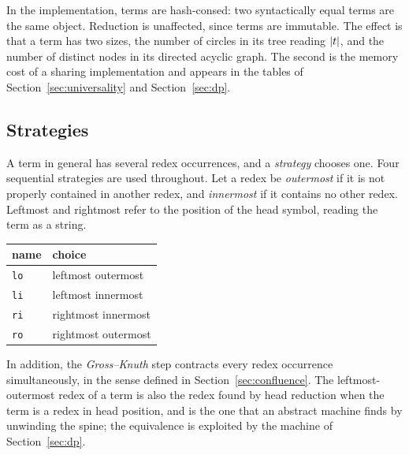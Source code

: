 \begin{remark}[Interning]
In the implementation, terms are hash-consed: two syntactically equal terms are the same object. Reduction is unaffected, since terms are immutable. The effect is that a term has two sizes, the number of circles in its tree reading $\lvert t\rvert$, and the number of distinct nodes in its directed acyclic graph. The second is the memory cost of a sharing implementation and appears in the tables of Section~\ref{sec:universality} and Section~\ref{sec:dp}.
\end{remark}

\subsection{Strategies}

A term in general has several redex occurrences, and a \emph{strategy} chooses one. Four sequential strategies are used throughout. Let a redex be \emph{outermost} if it is not properly contained in another redex, and \emph{innermost} if it contains no other redex. Leftmost and rightmost refer to the position of the head symbol, reading the term as a string.
\begin{center}
\begin{tabular}{ll}
\toprule
name & choice \\
\midrule
\texttt{lo} & leftmost outermost \\
\texttt{li} & leftmost innermost \\
\texttt{ri} & rightmost innermost \\
\texttt{ro} & rightmost outermost \\
\bottomrule
\end{tabular}
\end{center}
In addition, the \emph{Gross--Knuth} step contracts every redex occurrence simultaneously, in the sense defined in Section~\ref{sec:confluence}. The leftmost-outermost redex of a term is also the redex found by head reduction when the term is a redex in head position, and is the one that an abstract machine finds by unwinding the spine; the equivalence is exploited by the machine of Section~\ref{sec:dp}.
